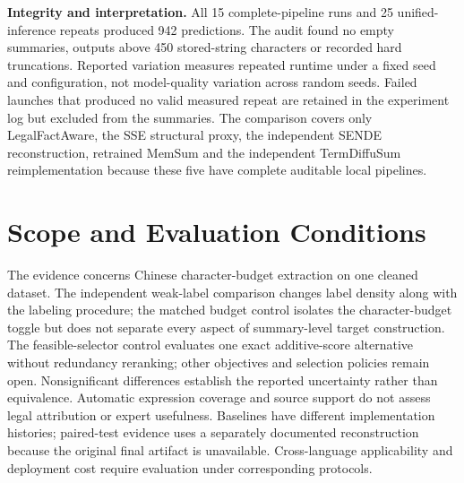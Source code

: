 \documentclass[10pt,twocolumn,letterpaper]{article}
\begin{document}
\textbf{Integrity and interpretation.} All 15 complete-pipeline runs and 25 unified-inference repeats produced 942 predictions. The audit found no empty summaries, outputs above 450 stored-string characters or recorded hard truncations. Reported variation measures repeated runtime under a fixed seed and configuration, not model-quality variation across random seeds. Failed launches that produced no valid measured repeat are retained in the experiment log but excluded from the summaries. The comparison covers only LegalFactAware, the SSE structural proxy, the independent SENDE reconstruction, retrained MemSum and the independent TermDiffuSum reimplementation because these five have complete auditable local pipelines.


\section{Scope and Evaluation Conditions}\label{appendix-scope}\label{limitations}
The evidence concerns Chinese character-budget extraction on one cleaned dataset. The independent weak-label comparison changes label density along with the labeling procedure; the matched budget control isolates the character-budget toggle but does not separate every aspect of summary-level target construction. The feasible-selector control evaluates one exact additive-score alternative without redundancy reranking; other objectives and selection policies remain open. Nonsignificant differences establish the reported uncertainty rather than equivalence. Automatic expression coverage and source support do not assess legal attribution or expert usefulness. Baselines have different implementation histories; paired-test evidence uses a separately documented reconstruction because the original final artifact is unavailable. Cross-language applicability and deployment cost require evaluation under corresponding protocols.
\end{document}

